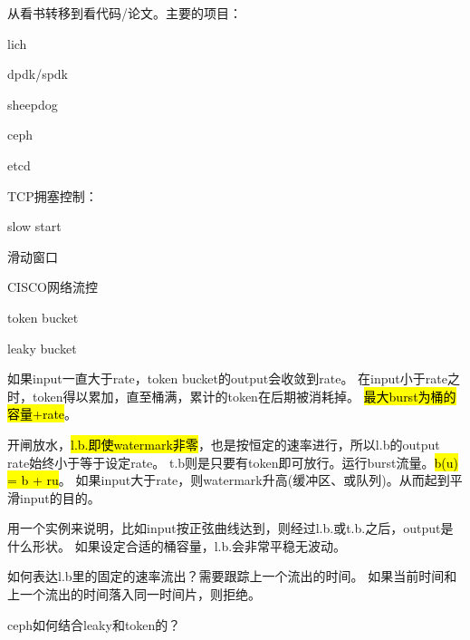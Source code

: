 从看书转移到看代码/论文。主要的项目：
\begin{enumbox}
\item lich
\item dpdk/spdk
\item sheepdog
\item ceph
\item etcd
\end{enumbox}

TCP拥塞控制：
\begin{enumbox}
\item slow start
\item 滑动窗口
\end{enumbox}

CISCO网络流控
\begin{enumbox}
\item token bucket
\item leaky bucket
\end{enumbox}

如果input一直大于rate，token bucket的output会收敛到rate。
在input小于rate之时，token得以累加，直至桶满，累计的token在后期被消耗掉。
\hl{最大burst为桶的容量+rate}。

开闸放水，\hl{l.b.即使watermark非零}，也是按恒定的速率进行，所以l.b的output rate始终小于等于设定rate。
t.b则是只要有token即可放行。运行burst流量。\hl{b(u) = b + ru}。
如果input大于rate，则watermark升高(缓冲区、或队列)。从而起到平滑input的目的。

用一个实例来说明，比如input按正弦曲线达到，则经过l.b.或t.b.之后，output是什么形状。
如果设定合适的桶容量，l.b.会非常平稳无波动。

如何表达l.b里的固定的速率流出？需要跟踪上一个流出的时间。
如果当前时间和上一个流出的时间落入同一时间片，则拒绝。

ceph如何结合leaky和token的？

